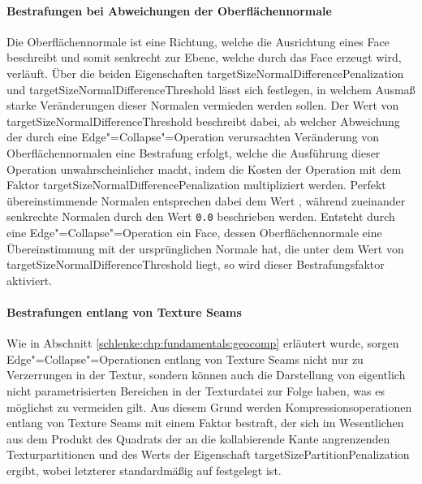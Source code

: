 \paragraph{Bestrafungen bei Abweichungen der Oberflächennormale} Die Oberflächennormale ist eine Richtung, welche die Ausrichtung eines Face beschreibt und somit senkrecht zur Ebene, welche durch das Face erzeugt wird, verläuft. Über die beiden Eigenschaften {\ttfamily target\-Size\-Normal\-Difference\-Penalization} und {\ttfamily target\-Size\-Normal\-Difference\-Threshold} lässt sich festlegen, in welchem Ausmaß starke Veränderungen dieser Normalen vermieden werden sollen. Der Wert von {\ttfamily target\-Size\-Normal\-Difference\-Threshold} beschreibt dabei, ab welcher Abweichung der durch eine Edge"=Collapse"=Operation verursachten Veränderung von Oberflächennormalen eine Bestrafung erfolgt, welche die Ausführung dieser Operation unwahrscheinlicher macht, indem die Kosten der Operation mit dem Faktor {\ttfamily target\-Size\-Normal\-Difference\-Penalization} multipliziert werden. Perfekt übereinstimmende Normalen entsprechen dabei dem Wert {}, während zueinander senkrechte Normalen durch den Wert {\lstinline|0.0|} beschrieben werden. Entsteht durch eine Edge"=Collapse"=Operation ein Face, dessen Oberflächennormale eine Übereinstimmung mit der ursprünglichen Normale hat, die unter dem Wert von {\ttfamily target\-Size\-Normal\-Difference\-Threshold} liegt, so wird dieser Bestrafungsfaktor aktiviert.

\paragraph{Bestrafungen entlang von Texture Seams} Wie in Abschnitt \ref{schlenke:chp:fundamentals:geocomp} erläutert wurde, sorgen Edge"=Collapse"=Operationen entlang von Texture Seams nicht nur zu Verzerrungen in der Textur, sondern können auch die Darstellung von eigentlich nicht parametrisierten Bereichen in der Texturdatei zur Folge haben, was es möglichst zu vermeiden gilt. Aus diesem Grund werden Kompressionsoperationen entlang von Texture Seams mit einem Faktor bestraft, der sich im Wesentlichen aus dem Produkt des Quadrats der an die kollabierende Kante angrenzenden Texturpartitionen und des Werts der Eigenschaft {\ttfamily target\-Size\-Partition\-Penalization} ergibt, wobei letzterer standardmäßig auf {} festgelegt ist.

